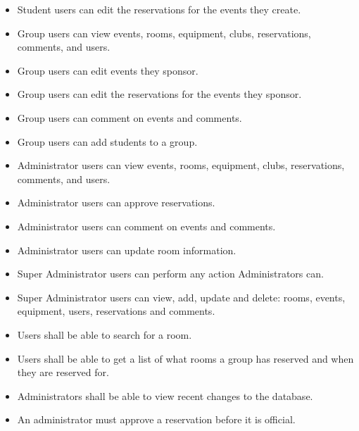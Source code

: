 \documentclass{article}
\begin{document}
\begin{itemize}
\item Student users can edit the reservations for the events they create.
\item Group users can view events, rooms, equipment, clubs, reservations, comments, and users.
\item Group users can edit events they sponsor.
\item Group users can edit the reservations for the events they sponsor.
\item Group users can comment on events and comments.
\item Group users can add students to a group.
\item Administrator users can view events, rooms, equipment, clubs, reservations, comments, and users.
\item Administrator users can approve reservations.
\item Administrator users can comment on events and comments.
\item Administrator users can update room information.
\item Super Administrator users can perform any action Administrators can.
\item Super Administrator users can view, add, update and delete: rooms, events, equipment, users, reservations and comments.
\item Users shall be able to search for a room.
\item Users shall be able to get a list of what rooms a group has
reserved and when they are reserved for.
\item Administrators shall be able to view recent changes to the database.
\item An administrator must approve a reservation before it is official.
\end{itemize}

\section{}


\end{document}
